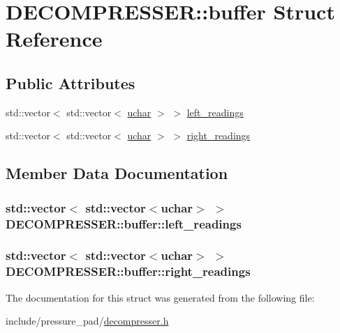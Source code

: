 \hypertarget{struct_d_e_c_o_m_p_r_e_s_s_e_r_1_1buffer}{\section{D\-E\-C\-O\-M\-P\-R\-E\-S\-S\-E\-R\-:\-:buffer Struct Reference}
\label{struct_d_e_c_o_m_p_r_e_s_s_e_r_1_1buffer}
}
\subsection*{Public Attributes}
\begin{DoxyCompactItemize}
\item 
std\-::vector$<$ std\-::vector$<$ \hyperlink{force__generator_8h_a65f85814a8290f9797005d3b28e7e5fc}{uchar} $>$ $>$ \hyperlink{struct_d_e_c_o_m_p_r_e_s_s_e_r_1_1buffer_adf1c2b81a848b0065c34ed6690a7b6e8}{left\-\_\-readings}
\item 
std\-::vector$<$ std\-::vector$<$ \hyperlink{force__generator_8h_a65f85814a8290f9797005d3b28e7e5fc}{uchar} $>$ $>$ \hyperlink{struct_d_e_c_o_m_p_r_e_s_s_e_r_1_1buffer_aeb7896d8a1613320d596c190a14b1f3a}{right\-\_\-readings}
\end{DoxyCompactItemize}


\subsection{Member Data Documentation}
\hypertarget{struct_d_e_c_o_m_p_r_e_s_s_e_r_1_1buffer_adf1c2b81a848b0065c34ed6690a7b6e8}{
\subsubsection[{left\-\_\-readings}]{\setlength{\rightskip}{0pt plus 5cm}std\-::vector$<$ std\-::vector$<${\bf uchar}$>$ $>$ D\-E\-C\-O\-M\-P\-R\-E\-S\-S\-E\-R\-::buffer\-::left\-\_\-readings}}\label{struct_d_e_c_o_m_p_r_e_s_s_e_r_1_1buffer_adf1c2b81a848b0065c34ed6690a7b6e8}
\hypertarget{struct_d_e_c_o_m_p_r_e_s_s_e_r_1_1buffer_aeb7896d8a1613320d596c190a14b1f3a}{
\subsubsection[{right\-\_\-readings}]{\setlength{\rightskip}{0pt plus 5cm}std\-::vector$<$ std\-::vector$<${\bf uchar}$>$ $>$ D\-E\-C\-O\-M\-P\-R\-E\-S\-S\-E\-R\-::buffer\-::right\-\_\-readings}}\label{struct_d_e_c_o_m_p_r_e_s_s_e_r_1_1buffer_aeb7896d8a1613320d596c190a14b1f3a}


The documentation for this struct was generated from the following file\-:\begin{DoxyCompactItemize}
\item 
include/pressure\-\_\-pad/\hyperlink{decompresser_8h}{decompresser.\-h}\end{DoxyCompactItemize}

